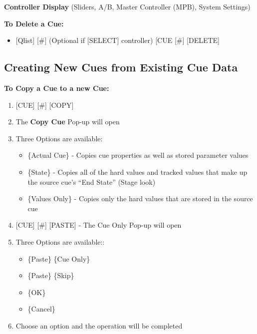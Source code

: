 \documentclass[
]{article}
\providecommand{\tightlist}{%
  \setlength{\itemsep}{0pt}\setlength{\parskip}{0pt}}
\begin{document}
\textbf{Controller Display} (Sliders, A/B, Master Controller (MPB), System Settings)

\textbf{To Delete a Cue:}

\begin{itemize}
\tightlist
\item
  {[}Qlist{]} {[}\#{]} (Optional if {[}SELECT{]} controller) {[}CUE {[}\#{]} {[}DELETE{]}
\end{itemize}

\hypertarget{creating-new-cues-from-existing-cue-data}{%
\subsection{Creating New Cues from Existing Cue Data}\label{creating-new-cues-from-existing-cue-data}}

\textbf{To Copy a Cue to a new Cue:}

\begin{enumerate}
\def\labelenumi{\arabic{enumi}.}
\item
  {{[}CUE{]} {[}\#{]} {[}COPY{]}}
\item
  {The \textbf{Copy Cue} Pop-up will open}
\item
  {Three Options are available: }

  \begin{itemize}
  \item
    {\{Actual Cue\} - Copies cue properties as well as stored parameter values}
  \item
    {\{State\} - Copies all of the hard values and tracked values that make up the source cue's ``End State'' (Stage look) }
  \item
    {\{Values Only\} - Copies only the hard values that are stored in the source cue}
  \end{itemize}
\item
  {{[}CUE{]} {[}\#{]} {[}PASTE{]} - The Cue Only Pop-up will open}
\item
  {Three Options are available:}:

  \begin{itemize}
  \item
    {\{Paste\} \{Cue Only\} }
  \item
    {\{Paste\} \{Skip\} }
  \item
    {\{OK\}}
  \item
    {\{Cancel\}}
  \end{itemize}
\item
  Choose an option and the operation will be completed
\end{enumerate}
\end{document}
